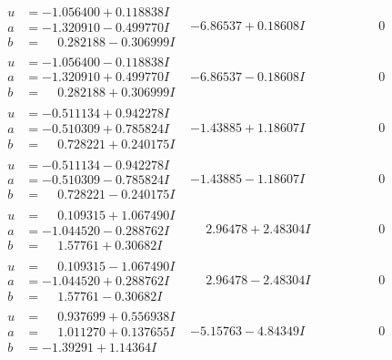 \documentclass[1p]{elsarticle_modified}
\theoremstyle{definition}
\begin{document}
$$\begin{array}{c|c|c}
\begin{aligned}
u &= -1.056400 + 0.118838 I \\
a &= -1.320910 - 0.499770 I \\
b &= \phantom{-}0.282188 - 0.306999 I\end{aligned}
 & -6.86537 + 0.18608 I & \phantom{-0.000000 } 0 \\ \hline\begin{aligned}
u &= -1.056400 - 0.118838 I \\
a &= -1.320910 + 0.499770 I \\
b &= \phantom{-}0.282188 + 0.306999 I\end{aligned}
 & -6.86537 - 0.18608 I & \phantom{-0.000000 } 0 \\ \hline\begin{aligned}
u &= -0.511134 + 0.942278 I \\
a &= -0.510309 + 0.785824 I \\
b &= \phantom{-}0.728221 + 0.240175 I\end{aligned}
 & -1.43885 + 1.18607 I & \phantom{-0.000000 } 0 \\ \hline\begin{aligned}
u &= -0.511134 - 0.942278 I \\
a &= -0.510309 - 0.785824 I \\
b &= \phantom{-}0.728221 - 0.240175 I\end{aligned}
 & -1.43885 - 1.18607 I & \phantom{-0.000000 } 0 \\ \hline\begin{aligned}
u &= \phantom{-}0.109315 + 1.067490 I \\
a &= -1.044520 - 0.288762 I \\
b &= \phantom{-}1.57761 + 0.30682 I\end{aligned}
 & \phantom{-}2.96478 + 2.48304 I & \phantom{-0.000000 } 0 \\ \hline\begin{aligned}
u &= \phantom{-}0.109315 - 1.067490 I \\
a &= -1.044520 + 0.288762 I \\
b &= \phantom{-}1.57761 - 0.30682 I\end{aligned}
 & \phantom{-}2.96478 - 2.48304 I & \phantom{-0.000000 } 0 \\ \hline\begin{aligned}
u &= \phantom{-}0.937699 + 0.556938 I \\
a &= \phantom{-}1.011270 + 0.137655 I \\
b &= -1.39291 + 1.14364 I\end{aligned}
 & -5.15763 - 4.84349 I & \phantom{-0.000000 } 0 \\ \hline\begin{aligned}

\end{aligned}
\end{array}$$
\end{document}
